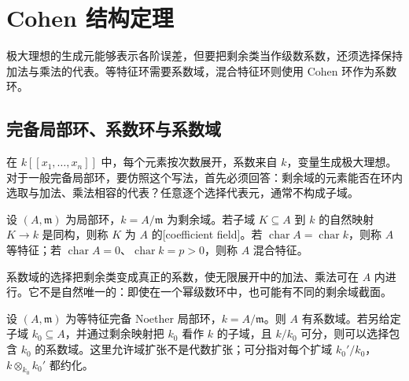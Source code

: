 
\section{Cohen 结构定理}
\label{b3:sec:D02}

极大理想的生成元能够表示各阶误差，但要把剩余类当作级数系数，还须选择保持加法与乘法的代表。等特征环需要系数域，混合特征环则使用 Cohen 环作为系数环。

%
%
%


\subsection{完备局部环、系数环与系数域}
\label{b3:subsec:D02:01}

在 \(k[\![x_1,\ldots,x_n]\!]\) 中，每个元素按次数展开，系数来自 \(k\)，变量生成极大理想。对于一般完备局部环，要仿照这个写法，首先必须回答：剩余域的元素能否在环内选取与加法、乘法相容的代表？任意逐个选择代表元，通常不构成子域。

\begin{definition}\label{b3:def:coefficient-field}
	设 \((A,\mathfrak m)\) 为局部环，\(k=A/\mathfrak m\) 为剩余域。若子域 \(K\subseteq A\) 到 \(k\) 的自然映射 \(K\to k\) 是同构，则称 \(K\) 为 \(A\) 的[coefficient field]。若 \(\operatorname{char}A=\operatorname{char}k\)，则称 \(A\) 等特征；若 \(\operatorname{char}A=0\)、\(\operatorname{char}k=p>0\)，则称 \(A\) 混合特征。
\end{definition}

系数域的选择把剩余类变成真正的系数，使无限展开中的加法、乘法可在 \(A\) 内进行。它不是自然唯一的：即使在一个幂级数环中，也可能有不同的剩余域截面。

\begin{theorem}[系数域的存在]\label{b3:thm:coefficient-field-existence}
	设 \((A,\mathfrak m)\) 为等特征完备 Noether 局部环，\(k=A/\mathfrak m\)。则 \(A\) 有系数域。若另给定子域 \(k_0\subseteq A\)，并通过剩余映射把 \(k_0\) 看作 \(k\) 的子域，且 \(k/k_0\) 可分，则可以选择包含 \(k_0\) 的系数域。这里允许域扩张不是代数扩张；可分指对每个扩域 \(k_0'/k_0\)，\(k\otimes_{k_0}k_0'\) 都约化。
\end{theorem}

